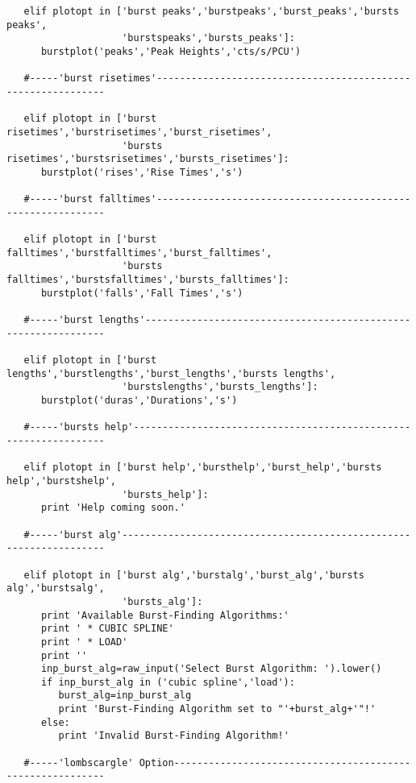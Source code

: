 \begin{verbatim}
   elif plotopt in ['burst peaks','burstpeaks','burst_peaks','bursts peaks',
                    'burstspeaks','bursts_peaks']:
      burstplot('peaks','Peak Heights','cts/s/PCU')

   #-----'burst risetimes'-------------------------------------------------------------

   elif plotopt in ['burst risetimes','burstrisetimes','burst_risetimes',
                    'bursts risetimes','burstsrisetimes','bursts_risetimes']:
      burstplot('rises','Rise Times','s')

   #-----'burst falltimes'-------------------------------------------------------------

   elif plotopt in ['burst falltimes','burstfalltimes','burst_falltimes',
                    'bursts falltimes','burstsfalltimes','bursts_falltimes']:
      burstplot('falls','Fall Times','s')

   #-----'burst lengths'---------------------------------------------------------------

   elif plotopt in ['burst lengths','burstlengths','burst_lengths','bursts lengths',
                    'burstslengths','bursts_lengths']:
      burstplot('duras','Durations','s')

   #-----'bursts help'-----------------------------------------------------------------

   elif plotopt in ['burst help','bursthelp','burst_help','bursts help','burstshelp',
                    'bursts_help']:
      print 'Help coming soon.'

   #-----'burst alg'-------------------------------------------------------------------

   elif plotopt in ['burst alg','burstalg','burst_alg','bursts alg','burstsalg',
                    'bursts_alg']:
      print 'Available Burst-Finding Algorithms:'
      print ' * CUBIC SPLINE'
      print ' * LOAD'
      print ''
      inp_burst_alg=raw_input('Select Burst Algorithm: ').lower()
      if inp_burst_alg in ('cubic spline','load'):
         burst_alg=inp_burst_alg
         print 'Burst-Finding Algorithm set to "'+burst_alg+'"!'
      else:
         print 'Invalid Burst-Finding Algorithm!'

   #-----'lombscargle' Option----------------------------------------------------------


\end{verbatim}
